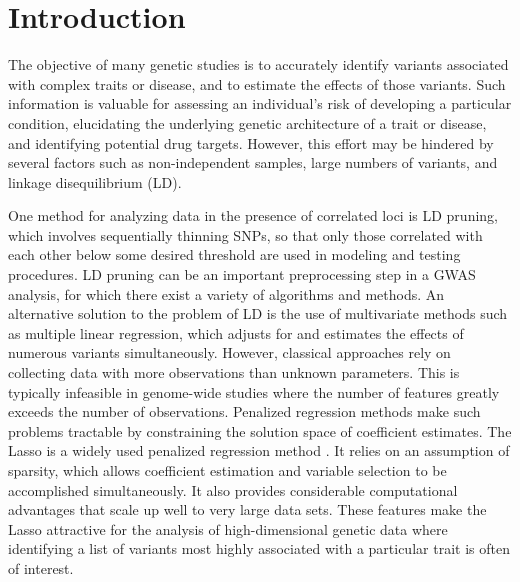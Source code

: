 
\section{Introduction}

The objective of many genetic studies is to accurately identify variants associated with complex traits or disease, and to estimate the effects of those variants. Such information is valuable for assessing an individual's risk of developing a particular condition, elucidating the underlying genetic architecture of a trait or disease, and identifying potential drug targets. However, this effort may be hindered by several factors such as non-independent samples, large numbers of variants, and linkage disequilibrium (LD). 


One method for analyzing data in the presence of correlated loci is LD pruning, which involves sequentially thinning SNPs, so that only those correlated with each other below some desired threshold are used in modeling and testing procedures. LD pruning can be an important preprocessing step in a GWAS analysis, for which there exist a variety of algorithms and methods. An alternative solution to the problem of LD is the use of multivariate methods such as multiple linear regression, which adjusts for and estimates the effects of numerous variants simultaneously. However, classical approaches rely on collecting data with more observations than unknown parameters. This is typically infeasible in genome-wide studies where the number of features greatly exceeds the number of observations. Penalized regression methods make such problems tractable by constraining the solution space of coefficient estimates. The Lasso is a widely used penalized regression method \citep{tibshirani1996regression}. It relies on an assumption of sparsity, which allows coefficient estimation and variable selection to be accomplished simultaneously. It also provides considerable computational advantages that scale up well to very large data sets. These features make the Lasso attractive for the analysis of high-dimensional genetic data where identifying a list of variants most highly associated with a particular trait is often of interest.

